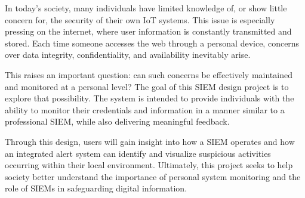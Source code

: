 In today’s society, many individuals have limited knowledge of, or show little concern for, the security of their own IoT systems. This issue is especially pressing on the internet, where user information is constantly transmitted and stored. Each time someone accesses the web through a personal device, concerns over data integrity, confidentiality, and availability inevitably arise.

This raises an important question: can such concerns be effectively maintained and monitored at a personal level? The goal of this SIEM design project is to explore that possibility. The system is intended to provide individuals with the ability to monitor their credentials and information in a manner similar to a professional SIEM, while also delivering meaningful feedback.

Through this design, users will gain insight into how a SIEM operates and how an integrated alert system can identify and visualize suspicious activities occurring within their local environment. Ultimately, this project seeks to help society better understand the importance of personal system monitoring and the role of SIEMs in safeguarding digital information.
